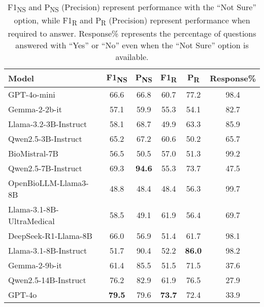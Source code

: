 \begin{table}[h]
\centering
\scriptsize
\begin{tabular}{@{}l c c c c c@{}}
\toprule
\textbf{Model} & \textbf{F1\textsubscript{NS}} & \textbf{P\textsubscript{NS}} & \textbf{F1\textsubscript{R}} & \textbf{P\textsubscript{R}} & \textbf{Response\%} \\ 
\midrule
GPT-4o-mini                     & 66.6  & 66.8 & 60.7 & 77.2 & 98.4   \\
Gemma-2-2b-it                  & 57.1  & 59.9 & 55.3 & 54.1 & 82.7   \\
Llama-3.2-3B-Instruct           & 58.1  & 68.7 & 49.9 & 63.3 & 85.9   \\
Qwen2.5-3B-Instruct             & 65.2  & 67.2 & 60.6 & 50.2 & 65.7   \\
BioMistral-7B                 & 56.5  & 50.5 & 57.0 & 51.3 & 99.2   \\
Qwen2.5-7B-Instruct             & 69.3  & \textbf{94.6} & 55.3 & 73.7 & 47.5   \\
OpenBioLLM-Llama3-8B            & 48.8  & 48.4 & 48.4 & 56.3 & 99.7   \\
Llama-3.1-8B-UltraMedical       & 58.5  & 49.1 & 61.9 & 56.4 & 69.7   \\
DeepSeek-R1-Llama-8B    & 66.0  & 56.9 & 51.4 & 61.7 & 98.1   \\
Llama-3.1-8B-Instruct           & 51.7  & 90.4 & 52.2 & \textbf{86.0} & 98.2   \\
Gemma-2-9b-it                  & 61.4  & 85.5 & 51.5 & 71.5 & 37.6   \\
Qwen2.5-14B-Instruct            & 76.2  & 82.9 & 61.9 & 76.5 & 27.9   \\
GPT-4o                         & \textbf{79.5}  & 79.6 & \textbf{73.7} & 72.4 & 33.9   \\
\bottomrule
\end{tabular}
\caption{F1\textsubscript{NS} and P\textsubscript{NS} (Precision) represent performance with the ``Not Sure'' option, while F1\textsubscript{R} and P\textsubscript{R} (Precision) represent performance when required to answer. Response\% represents the percentage of questions answered with ``Yes'' or ``No'' even when the ``Not Sure'' option is available.}
\label{tab:model-comparison}
\end{table}